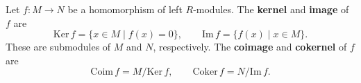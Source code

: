 Let $f: M \to N$ be a homomorphism of left $R$-modules. The \textbf{kernel} and \textbf{image} of $f$ are
$$\text{Ker}\, f = \{x \in M \mid f(x) = 0\}, \qquad \text{Im}\, f = \{f(x) \mid x \in M\}.$$
These are submodules of $M$ and $N$, respectively. The \textbf{coimage} and \textbf{cokernel} of $f$ are
$$\text{Coim}\, f = M / \text{Ker}\, f, \qquad \text{Coker}\, f = N / \text{Im}\, f.$$
